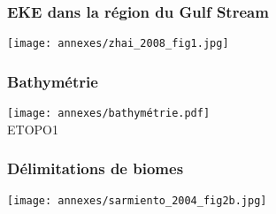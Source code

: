 \documentclass[11pt, french, aspectratio=32]{beamer}
\begin{document}
\begin{frame}
  \frametitle{EKE dans la région du Gulf Stream}
  \texttt{[image: annexes/zhai\_2008\_fig1.jpg]}
  \\
\end{frame}

\begin{frame}
  \frametitle{Bathymétrie}
  \texttt{[image: annexes/bathymétrie.pdf]}
  \\
  ETOPO1
\end{frame}

\begin{frame}
  \frametitle{Délimitations de biomes}
  \texttt{[image: annexes/sarmiento\_2004\_fig2b.jpg]}
  \\
\end{frame}
\end{document}
